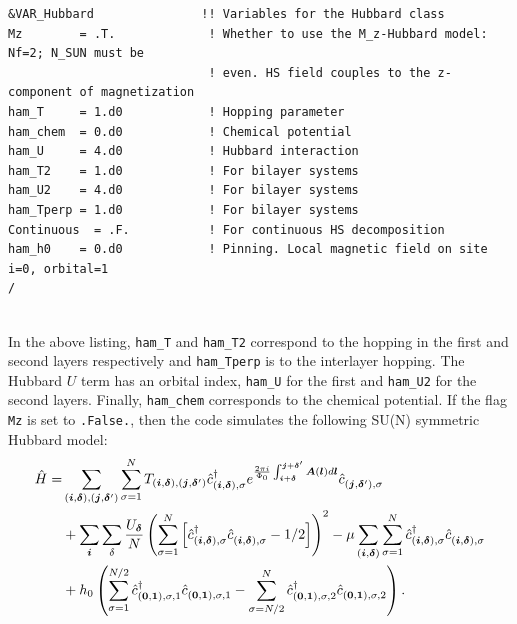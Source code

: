 \begin{lstlisting}[style=fortran,escapechar=\#,breaklines=true]
&VAR_Hubbard               !! Variables for the Hubbard class
Mz        = .T.             ! Whether to use the M_z-Hubbard model: Nf=2; N_SUN must be  
                            ! even. HS field couples to the z-component of magnetization
ham_T     = 1.d0            ! Hopping parameter
ham_chem  = 0.d0            ! Chemical potential
ham_U     = 4.d0            ! Hubbard interaction
ham_T2    = 1.d0            ! For bilayer systems
ham_U2    = 4.d0            ! For bilayer systems
ham_Tperp = 1.d0            ! For bilayer systems
Continuous  = .F.           ! For continuous HS decomposition
ham_h0    = 0.d0            ! Pinning. Local magnetic field on site i=0, orbital=1
/
               
\end{lstlisting}
In the above listing, \texttt{ham\_T} and \texttt{ham\_T2} correspond to the hopping in the first and second layers respectively and  \texttt{ham\_Tperp} is to the interlayer hopping.   The Hubbard $U$ term has an orbital index, \texttt{ham\_U}  for the first and \texttt{ham\_U2} for the second layers.  Finally,  \texttt{ham\_chem}  corresponds to the chemical potential.    If the flag \texttt{Mz} is set to \texttt{.False.}, then the code simulates the following SU(N) symmetric Hubbard model:
\begin{align}
\hat{H} =& \sum_{(\ve{i},\ve{\delta}), (\ve{j},\ve{\delta}')}  \sum_{\sigma =1}^{N}  T_{(\ve{i},\ve{\delta}), (\ve{j},\ve{\delta}')}    \hat{c}^{\dagger}_{(\ve{i},\ve{\delta}), \sigma }   e^{\frac{2 \pi i}{\Phi_0} \int_{\ve{i} + \ve{\delta}}^{\ve{j} + \ve{\delta}'}  
     \vec{A}(\ve{l})  d \ve{l}} \hat{c}^{}_{(\ve{j},\ve{\delta}'),\sigma} \nonumber \\
  & + \sum_{\vec{i}} \sum_{\delta}   \frac{U_{\ve{\delta}} }{N} \left(\sum_{\sigma=1}^{N}  \left[   \hat{c}^{\dagger}_{(\vec{i},\ve{\delta}),\sigma } 
    \hat{c}^{\phantom\dagger}_{(\vec{i}, \ve{\delta}),\sigma }  - 1/2  \right] \right)^2
    - \mu \sum_{(\ve{i},\ve{\delta})}  \sum_{\sigma =1}^{N} \hat{c}^{\dagger}_{(\vec{i},\ve{\delta}),\sigma } \hat{c}^{\phantom\dagger}_{(\vec{i},\ve{\delta}),\sigma } \nonumber \\
    &  + h_0 \left(\sum_{\sigma=1}^{N/2} \hat{c}^{\dagger}_{(\vec{0},\ve{1}),\sigma, 1}  \hat{c}^{}_{(\vec{0},\ve{1}),\sigma, 1}  -  \sum_{\sigma=N/2}^{N} \hat{c}^{\dagger}_{(\vec{0},\ve{1}),\sigma, 2}  \hat{c}^{}_{(\vec{0},\ve{1}),\sigma, 2} \right) .
\end{align}
